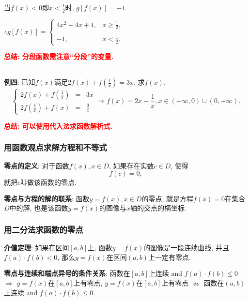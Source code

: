\documentclass[8pt]{article}
\begin{document}
					当$f(x)< 0$即$\displaystyle x< \frac{1}{2}$时, $g[f(x)]=-1$.

					$\displaystyle \therefore g[f(x)]=\left\{\begin{array}{rl}4x^2-4x+1,&x\geq \displaystyle \frac{1}{2},\\\\-1,&x<\displaystyle \frac{1}{2}.\end{array}\right.$

					\textbf{\textcolor{red}{总结: 分段函数需注意“分段”的变量.}}

				~\\

				\textbf{例四}: 已知$f(x)$满足$2f(x)+f\displaystyle \left(\frac{1}{x}\right)=3x$. 求$f(x)$.
					~\\

					$$
					\left\{
					\begin{array}{rcl}
						2f(x)+\displaystyle f\left(\frac{1}{x}\right)&=&3x\\
						2\displaystyle f\left(\frac{1}{x}\right)+f(x)&=&\displaystyle\frac{3}{x}
					\end{array}
					\right.
					\Rightarrow f(x)=2x-\displaystyle \frac{1}{x}, x\in(-\infty, 0)\cup(0, +\infty).
					$$

					\textbf{\textcolor{red}{总结: 可以使用代入法求函数解析式.}}

			\subsubsection{用函数观点求解方程和不等式}
				\textbf{零点的定义}: 对于函数$f(x), x\in D$, 如果存在实数$c\in D$, 使得$$f(c)=0,$$ 就把$c$叫做该函数的零点.

				\textbf{零点与方程的解的联系}: 函数$y=f(x), x\in D$的零点, 就是方程$f(x)=0$在集合$D$中的解, 也是该函数$y=f(x)$的图像与$x$轴的交点的横坐标.

			\subsubsection{用二分法求函数的零点}
				\textbf{介值定理}: 如果在区间$[a, b]$上, 函数$y=f(x)$的图像是一段连续曲线, 并且$f(a)\cdot f(b)<0$, 那么$y=f(x)$在区间$(a, b)$上一定有零点.

				\textbf{零点与连续和端点异号的条件关系}: 函数在$[a, b]$上连续 and $f(a) \cdot f(b) \leq 0$ $\Rightarrow$ $y=f(x)$在$[a, b]$上有零点, $y=f(x)$在$[a, b]$上有零点 $\nRightarrow$ 函数在$(a, b)$上连续 and $f(a) \cdot f(b) \leq 0$.
\end{document}
